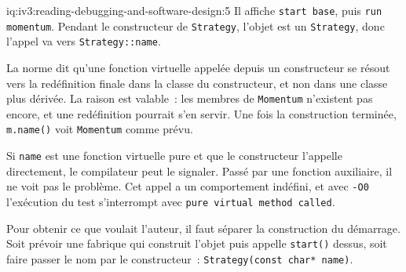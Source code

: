 \begin{solution}{iq:iv3:reading-debugging-and-software-design:5}
Il affiche \texttt{start base}, puis \texttt{run momentum}. Pendant le constructeur de \texttt{Strategy}, l'objet est un \texttt{Strategy}, donc l'appel va vers \texttt{Strategy::name}.

La norme dit qu'une fonction virtuelle appelée depuis un constructeur se résout vers la redéfinition finale dans la classe du constructeur, et non dans une classe plus dérivée. La raison est valable~: les membres de \texttt{Momentum} n'existent pas encore, et une redéfinition pourrait s'en servir. Une fois la construction terminée, \texttt{m.name()} voit \texttt{Momentum} comme prévu.

Si \texttt{name} est une fonction virtuelle pure et que le constructeur l'appelle directement, le compilateur peut le signaler. Passé par une fonction auxiliaire, il ne voit pas le problème. Cet appel a un comportement indéfini, et avec \texttt{-O0} l'exécution du test s'interrompt avec \texttt{pure virtual method called}.

Pour obtenir ce que voulait l'auteur, il faut séparer la construction du démarrage. Soit prévoir une fabrique qui construit l'objet puis appelle \texttt{start()} dessus, soit faire passer le nom par le constructeur~: \texttt{Strategy(const char* name)}.


\end{solution}

